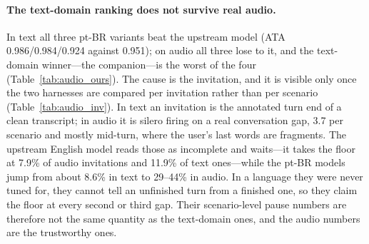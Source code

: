 \documentclass[conference]{IEEEtran}
\begin{document}
\begin{table}[t]
\centering
\caption{The four models on real FDB v1.0 audio (727 scenarios each), scored by
upstream's evaluators. ``Paper conv.'' is the paper's ATA reconstructed as the
mean of five oriented TOR columns, backchannel included---it reproduces both
published rows exactly; ours is the project's four-term convention with its two
guards (\S\ref{sec:fdb_setup}).}
\label{tab:audio_ours}
\footnotesize
{}
\end{table}

\paragraph{The text-domain ranking does not survive real audio.} In text all three
pt-BR variants beat the upstream model (ATA 0.986/0.984/0.924 against 0.951); on
audio all three lose to it, and the text-domain winner---the companion---is the
worst of the four (Table~\ref{tab:audio_ours}). The cause is the invitation, and
it is visible only once the two harnesses are compared per invitation rather than
per scenario (Table~\ref{tab:audio_inv}). In text an invitation is the annotated
turn end of a clean transcript; in audio it is silero firing on a real
conversation gap, 3.7 per scenario and mostly mid-turn, where the user's last
words are fragments. The upstream English model reads those as incomplete and
waits---it takes the floor at 7.9\% of audio invitations and 11.9\% of text
ones---while the pt-BR models jump from about 8.6\% in text to 29--44\% in audio.
In a language they were never tuned for, they cannot tell an unfinished turn from
a finished one, so they claim the floor at every second or third gap. Their
scenario-level pause numbers are therefore not the same quantity as the
text-domain ones, and the audio numbers are the trustworthy ones.
\end{document}
